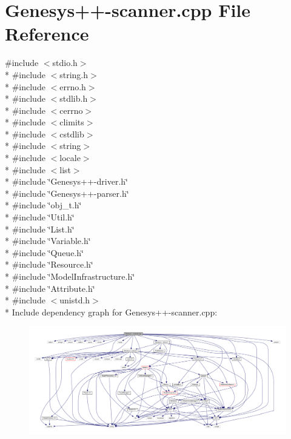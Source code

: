 \hypertarget{_genesys_09_09-scanner_8cpp}{\section{Genesys++-\/scanner.cpp File Reference}
\label{_genesys_09_09-scanner_8cpp}
}
{\ttfamily \#include $<$stdio.\-h$>$}\\*
{\ttfamily \#include $<$string.\-h$>$}\\*
{\ttfamily \#include $<$errno.\-h$>$}\\*
{\ttfamily \#include $<$stdlib.\-h$>$}\\*
{\ttfamily \#include $<$cerrno$>$}\\*
{\ttfamily \#include $<$climits$>$}\\*
{\ttfamily \#include $<$cstdlib$>$}\\*
{\ttfamily \#include $<$string$>$}\\*
{\ttfamily \#include $<$locale$>$}\\*
{\ttfamily \#include $<$list$>$}\\*
{\ttfamily \#include \char`\"{}Genesys++-\/driver.\-h\char`\"{}}\\*
{\ttfamily \#include \char`\"{}Genesys++-\/parser.\-h\char`\"{}}\\*
{\ttfamily \#include \char`\"{}obj\-\_\-t.\-h\char`\"{}}\\*
{\ttfamily \#include \char`\"{}Util.\-h\char`\"{}}\\*
{\ttfamily \#include \char`\"{}List.\-h\char`\"{}}\\*
{\ttfamily \#include \char`\"{}Variable.\-h\char`\"{}}\\*
{\ttfamily \#include \char`\"{}Queue.\-h\char`\"{}}\\*
{\ttfamily \#include \char`\"{}Resource.\-h\char`\"{}}\\*
{\ttfamily \#include \char`\"{}Model\-Infrastructure.\-h\char`\"{}}\\*
{\ttfamily \#include \char`\"{}Attribute.\-h\char`\"{}}\\*
{\ttfamily \#include $<$unistd.\-h$>$}\\*
Include dependency graph for Genesys++-\/scanner.cpp\-:
\nopagebreak
\begin{figure}[H]
\begin{center}
\leavevmode
\includegraphics[width=350pt]{_genesys_09_09-scanner_8cpp__incl}
\end{center}
\end{figure}
